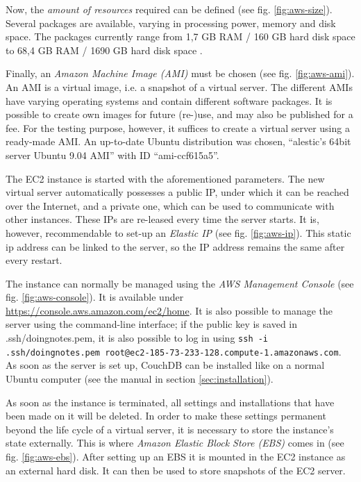 Now, the \textit{amount of resources} required can be defined (see fig. \ref{fig:aws-size}). Several packages are available, varying in processing power, memory and disk space. The packages currently range from 1,7 GB RAM / 160 GB hard disk space to 68,4 GB RAM / 1690 GB hard disk space \cite{aws:instances}.

Finally, an \textit{Amazon Machine Image (AMI)} must be chosen (see fig. \ref{fig:aws-ami}). An AMI is a virtual image, i.e. a snapshot of a virtual server. The different AMIs have varying operating systems and contain different software packages. It is possible to create own images for future (re-)use, and may also be published for a fee. For the testing purpose, however, it suffices to create a virtual server using a ready-made AMI. An up-to-date Ubuntu distribution was chosen, \enquote{alestic's 64bit server Ubuntu 9.04 AMI} with ID \enquote{ami-ccf615a5}.

The EC2 instance is started with the aforementioned parameters. The new virtual server automatically possesses a public IP, under which it can be reached over the Internet, and a private one, which can be used to communicate with other instances. These IPs are re-leased every time the server starts. It is, however, recommendable to set-up an \textit{Elastic IP} (see fig. \ref{fig:aws-ip}). This static ip address can be linked to the server, so the IP address remains the same after every restart.

The instance can normally be managed using the \textit{AWS Management Console} (see fig. \ref{fig:aws-console}). It is available under \url{https://console.aws.amazon.com/ec2/home}. It is also possible to manage the server using the command-line interface; if the public key is saved in {\selectfont .ssh/doingnotes.pem}, it is also possible to log in using \lstinline!ssh -i .ssh/doingnotes.pem root@ec2-185-73-233-128.compute-1.amazonaws.com!. As soon as the server is set up, CouchDB can be installed like on a normal Ubuntu computer (see the manual in section \ref{sec:installation}).

As soon as the instance is terminated, all settings and installations that have been made on it will be deleted. In order to make these settings permanent beyond the life cycle of a virtual server, it is necessary to store the instance's state externally. This is where \textit{Amazon Elastic Block Store (EBS)} comes in (see fig. \ref{fig:aws-ebs}). After setting up an EBS it is mounted in the EC2 instance as an external hard disk. It can then be used to store snapshots of the EC2 server.

